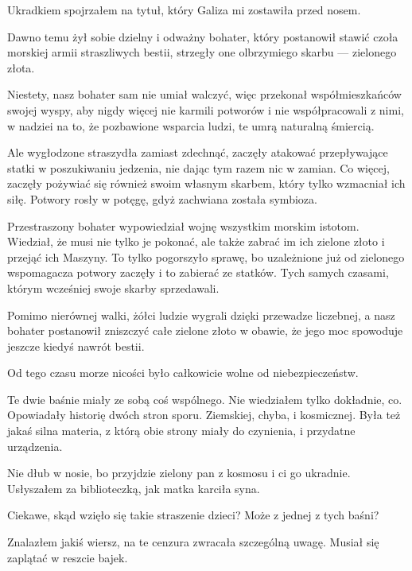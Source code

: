 Ukradkiem spojrzałem na tytuł, który Galiza mi zostawiła przed nosem.

\begin{poem}
	Dawno temu żył sobie dzielny i odważny bohater, który postanowił stawić czoła morskiej armii straszliwych bestii, strzegły one olbrzymiego skarbu --- zielonego złota.
	
	Niestety, nasz bohater sam nie umiał walczyć, więc przekonał współmieszkańców swojej wyspy, aby nigdy więcej nie karmili potworów i nie współpracowali z nimi, w nadziei na to, że pozbawione wsparcia ludzi, te umrą naturalną śmiercią.
	
	Ale wygłodzone straszydła zamiast zdechnąć, zaczęły atakować przepływające statki w poszukiwaniu jedzenia, nie dając tym razem nic w zamian. Co więcej, zaczęły pożywiać się również swoim własnym skarbem, który tylko wzmacniał ich siłę. Potwory rosły w potęgę, gdyż zachwiana została symbioza.
	
	Przestraszony bohater wypowiedział wojnę wszystkim morskim istotom. Wiedział, że musi nie tylko je pokonać, ale także zabrać im ich zielone złoto i przejąć ich Maszyny.
	To tylko pogorszyło sprawę, bo uzależnione już od zielonego wspomagacza potwory zaczęły i to zabierać ze statków. Tych samych czasami, którym wcześniej swoje skarby sprzedawali.
	
	Pomimo nierównej walki, żółci ludzie wygrali dzięki przewadze liczebnej, a nasz bohater postanowił zniszczyć całe zielone złoto w obawie, że jego moc spowoduje jeszcze kiedyś nawrót bestii.
	
	Od tego czasu morze nicości było całkowicie wolne od niebezpieczeństw.
\end{poem}

Te dwie baśnie miały ze sobą coś wspólnego. Nie wiedziałem tylko dokładnie, co. Opowiadały historię dwóch stron sporu. Ziemskiej, chyba, i kosmicznej.
Była też jakaś silna materia, z którą obie strony miały do czynienia, i przydatne urządzenia.

\begin{dialogue}
	\ds{} Nie dłub w nosie, bo przyjdzie zielony pan z kosmosu i ci go ukradnie. \dm{} Usłyszałem za biblioteczką, jak matka karciła syna.
\end{dialogue}

Ciekawe, skąd wzięło się takie straszenie dzieci? Może z jednej z tych baśni? 

Znalazłem jakiś wiersz, na te cenzura zwracała szczególną uwagę. Musiał się zaplątać w reszcie bajek.

